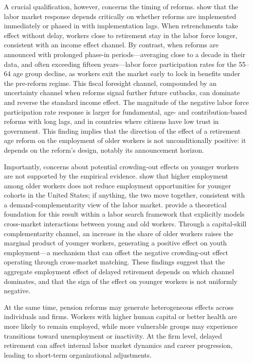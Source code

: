 \documentclass[11pt,english,a4paper, twoside, authoryear]{article}
\begin{document}
A crucial qualification, however, concerns the timing of reforms. \citet{BiZubairy2023} show that the labor market response depends critically on whether reforms are implemented immediately or phased in with implementation lags. When retrenchments take effect without delay, workers close to retirement stay in the labor force longer, consistent with an income effect channel. By contrast, when reforms are announced with prolonged phase-in periods---averaging close to a decade in their data, and often exceeding fifteen years---labor force participation rates for the 55--64 age group decline, as workers exit the market early to lock in benefits under the pre-reform regime. This fiscal foresight channel, compounded by an uncertainty channel when reforms signal further future cutbacks, can dominate and reverse the standard income effect. The magnitude of the negative labor force participation rate response is larger for fundamental, age- and contribution-based reforms with long lags, and in countries where citizens have low trust in government. This finding implies that the direction of the effect of a retirement age reform on the employment of older workers is not unconditionally positive: it depends on the reform's design, notably its announcement horizon.

Importantly, concerns about potential crowding-out effects on younger workers are not supported by the empirical evidence. \citet{MunnellWu2012} show that higher employment among older workers does not reduce employment opportunities for younger cohorts in the United States; if anything, the two move together, consistent with a demand-complementarity view of the labor market. \citet{Dai2022} provide a theoretical foundation for this result within a labor search framework that explicitly models cross-market interactions between young and old workers. Through a capital-skill complementarity channel, an increase in the share of older workers raises the marginal product of younger workers, generating a positive effect on youth employment---a mechanism that can offset the negative crowding-out effect operating through cross-market matching. These findings suggest that the aggregate employment effect of delayed retirement depends on which channel dominates, and that the sign of the effect on younger workers is not uniformly negative.

At the same time, pension reforms may generate heterogeneous effects across individuals and firms. Workers with higher human capital or better health are more likely to remain employed, while more vulnerable groups may experience transitions toward unemployment or inactivity. At the firm level, delayed retirement can affect internal labor market dynamics and career progression, leading to short-term organizational adjustments.
\end{document}
